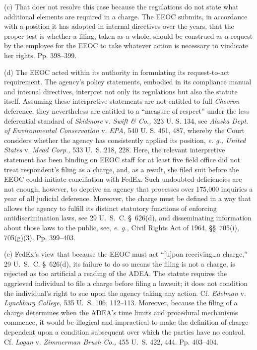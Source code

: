     (c) That does not resolve this case because the regulations do
not state what additional elements are required in a charge. The EEOC
submits, in accordance with a position it has adopted in internal
directives over the years, that the proper test is whether a filing,
taken as a whole, should be construed as a request by the employee for
the EEOC to take whatever action is necessary to vindicate her rights.
Pp. 398--399.

    (d) The EEOC acted within its authority in formulating its
request-to-act requirement. The agency's policy statements, embodied
in its compliance manual and internal directives, interpret not only its
regulations but also the statute itself. Assuming these interpretive
statements are not entitled to full \emph{Chevron} deference, they
nevertheless are entitled to a ``measure of respect'' under the less
deferential standard of \emph{Skidmore} v. \emph{Swift \& Co.,} 323 U. S.
134, see \emph{Alaska Dept. of Environmental Conservation} v. \emph{EPA,}
540 U. S. 461, 487, whereby the Court considers whether the agency
has consistently applied its position, \emph{e. g., United States} v.
\emph{Mead Corp.,} 533 U.~S. 218, 228. Here, the relevant interpretive
statement has been binding on EEOC staff for at least five \newpage 
field office did not treat respondent's filing as a charge, and, as
a result, she filed suit before the EEOC could initiate conciliation
with FedEx. Such undoubted deficiencies are not enough, however, to
deprive an agency that processes over 175,000 inquiries a year of all
judicial deference. Moreover, the charge must be defined in a way
that allows the agency to fulfill its distinct statutory functions of
enforcing antidiscrimination laws, see 29 U.~S.~C. \S~626(d),
and disseminating information about those laws to the public, see,
\emph{e. g.,} Civil Rights Act of 1964, \S\S~705(i), 705(g)(3). Pp.
399--403.

    (e) FedEx's view that because the EEOC must act ``[u]pon
receiving\dots a charge,'' 29 U.~S.~C. \S~626(d), its failure
to do so means the filing is not a charge, is rejected as too artificial
a reading of the ADEA. The statute requires the aggrieved individual
to file a charge before filing a lawsuit; it does not condition the
individual's right to sue upon the agency taking any action. Cf.
\emph{Edelman} v. \emph{Lynchburg College,} 535 U.~S. 106, 112--113.
Moreover, because the filing of a charge determines when the ADEA's
time limits and procedural mechanisms commence, it would be illogical
and impractical to make the definition of charge dependent upon a
condition subsequent over which the parties have no control. Cf.
\emph{Logan} v. \emph{Zimmerman Brush Co.,} 455 U.~S. 422, 444. Pp.
403--404.


